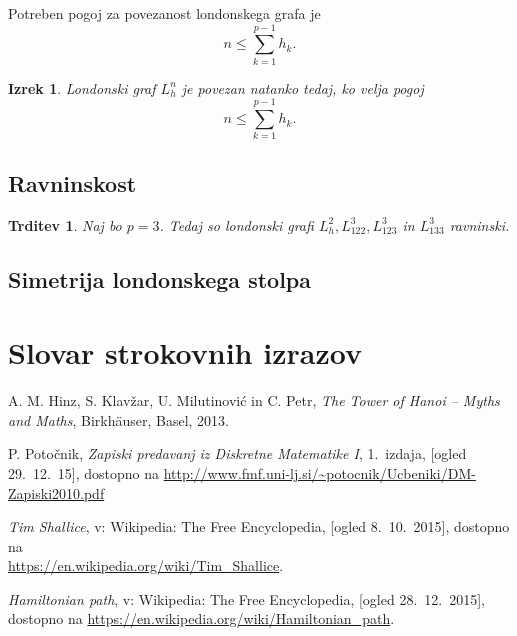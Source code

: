 \documentclass[12pt,a4paper]{amsart}
\theoremstyle{definition} %
\theoremstyle{plain} %
\newtheorem{izrek}[definicija]{Izrek}
\newtheorem{trditev}[definicija]{Trditev}
\newcommand{\geslo}[2]{\noindent\textbf{#1}\hspace*{3mm}\hangindent=\parindent\hangafter=1 #2}
\begin{document}
Potreben pogoj za povezanost londonskega grafa je 
\[ n \leq \sum_{k=1}^{p-1} h_k. \]
\begin{izrek}
    Londonski graf $L_h^n$ je povezan natanko tedaj, ko velja pogoj
    \[ n \leq \sum_{k=1}^{p-1} h_k. \]
\end{izrek}

\subsection{Ravninskost}

\begin{trditev}
    Naj bo $p=3$. Tedaj so londonski grafi $L_h^2, L_{122}^3,L_{123}^3$ in $ L_{133}^3$ ravninski.
\end{trditev}

\subsection{Simetrija londonskega stolpa}

\section*{Slovar strokovnih izrazov}

%
%

\begin{thebibliography}{99}

 A. M. Hinz, S. Klavžar, U. Milutinović in C. Petr, \emph{The Tower of Hanoi – Myths and Maths}, Birkhäuser, Basel, 2013.

 P. Potočnik, \emph{Zapiski predavanj iz Diskretne Matematike I}, 1.~izdaja, [ogled 29.~12.~15], dostopno na \url{http://www.fmf.uni-lj.si/~potocnik/Ucbeniki/DM-Zapiski2010.pdf}

 \emph{Tim Shallice}, v: Wikipedia: The Free Encyclopedia, [ogled 8.~10.~2015], dostopno na\\ \url{https://en.wikipedia.org/wiki/Tim_Shallice}.

 \emph{Hamiltonian path}, v: Wikipedia: The Free Encyclopedia, [ogled 28.~12.~2015], dostopno na \url{https://en.wikipedia.org/wiki/Hamiltonian_path}.
\end{thebibliography}
\end{document}
